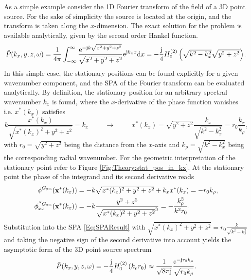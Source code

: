 As a simple example consider the 1D Fourier transform of the field of a 3D point source.
For the sake of simplicity the source is located at the origin, and the transform is taken along the $x$-dimension.
The exact solution for the problem is available analytically, given by the second order Hankel function.
\begin{equation}
\tilde{P}(k_x,y,z,\omega) = \frac{1}{4\pi} \int_{-\infty}^{\infty} \frac{\mathrm{e}^{-\mathrm{j} k \sqrt{x^2 + y^2 + z^2}}}{\sqrt{x^2 + y^2 + z^2}} \mathrm{e}^{\mathrm{j} k_x x} \mathrm{d} x = 
-\frac{\mathrm{j}}{4} H_0^{(2)}\left( \sqrt{k^2- k_x^2} \sqrt{y^2 + z^2} \right).
\label{Eq:HF_approx:Greens_spectrum_defintion}
\end{equation}
In this simple case, the stationary positions can be found explicitly for a given wavenumber component, and the SPA of the Fourier transform can be evaluated analytically. 
By definition, the stationary position for an arbitrary spectral wavenumber $k_x$ is found, where the $x$-derivative of the phase function vanishes i.e. $x^*(k_x)$ satisfies
\begin{equation}
k \frac{x^*(k_x)}{\sqrt{x^*(k_x)^2 + y^2 + z^2}} = k_x 
\hspace{1cm} \rightarrow \hspace{1cm} 
x^*(k_x) = \sqrt{y^2 + z^2} \frac{k_x}{\sqrt{k^2 - k_x^2}}  = r_0 \frac{k_x}{k_{\rho}},
\label{eq:HF_approx:greens_spectrum_stat_point}
\end{equation}
with $r_0 = \sqrt{y^2+z^2}$ being the distance from the $x$-axis and $k_{\rho} = \sqrt{k^2-k_x^2}$ being the corresponding radial wavenumber.
For the geometric interpretation of the stationary point refer to Figure \ref{Fig:Theory:stat_pos_in_kx}.
At the stationary point the phase of the integrand and its second derivative reads
\begin{align}
\phi^{G_{3\mathrm{D}}}(\mathbf{x}^*(k_x)) &=  -k \sqrt{x^*(k_x)^2 + y^2 + z^2} + k_x x^*(k_x) = -r_0 k_{\rho},\\
\phi^{''G_{3\mathrm{D}}}_{xx}(\mathbf{x}^*(k_x)) &=  -k \frac{y^2+z^2}{\sqrt{ x^*(k_x)^2 +y^2+z^2 }^3} = - \frac{k_{\rho}^3}{k^2 r_0}.
\end{align}
Substitution into the SPA \eqref{Eq:SPAResult} with $\sqrt{x^*(k_x)^2 + y^2 + z^2} = r_0\frac{k}{\sqrt{k^2 - k_x^2}}$ and taking the negative sign of the second derivative into account yields the asymptotic form of the 3D point source spectrum
\begin{equation}
\tilde{P}(k_x,y,z,\omega) = -\frac{\mathrm{j}}{4} H_0^{(2)}\left( k_{\rho} r_0 \right) \approx \frac{1}{\sqrt{8\pi \mathrm{j}}} \frac{\mathrm{e} ^{-\mathrm{j} r_0 k_{\rho}}}{\sqrt{r_0 k_{\rho} }}.
\label{Eq:25D_WFS:3D_Greens_asymp_spectrum}
\end{equation}
